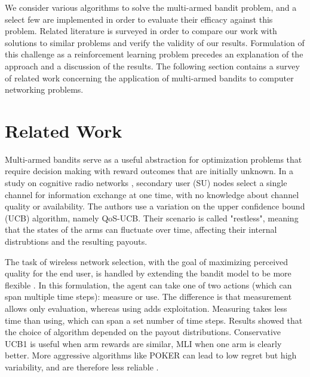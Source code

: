 \documentclass{article}
\begin{document}
We consider various algorithms to solve the multi-armed bandit problem, and a select few are implemented in order to evaluate their efficacy against this problem. 
Related literature is surveyed in order to compare our work with solutions to similar problems and verify the validity of our results. Formulation of this challenge 
as a reinforcement learning problem precedes an explanation of the approach and a discussion of the results. The following section contains a survey of related work 
concerning the application of multi-armed bandits to computer networking problems.

\section{Related Work}

Multi-armed bandits serve as a useful abstraction for optimization problems that require decision making with reward outcomes that are initially unknown. In a study 
on cognitive radio networks \cite{qos_selection_mab}, secondary user (SU) nodes select a single channel for information exchange at one time, with no knowledge about 
channel quality or availability. The authors use a variation on the upper confidence bound (UCB) algorithm, namely QoS-UCB. Their scenario is called "restless", 
meaning that the states of the arms can fluctuate over time, affecting their internal distrubtions and the resulting payouts.

The task of wireless network selection, with the goal of maximizing perceived quality for the end user, is handled by extending the bandit model to be more flexible 
\cite{muMAB_wireless}. In this formulation, the agent can take one of two actions (which can span multiple time steps): measure or use. The difference is that 
measurement allows only evaluation, whereas using adds exploitation. Measuring takes less time than using, which can span a set number of time steps. Results showed 
that the choice of algorithm depended on the payout distributions. Conservative UCB1 is useful when arm rewards are similar, MLI when one arm is clearly better. 
More aggressive algorithms like POKER can lead to low regret but high variability, and are therefore less reliable \cite{muMAB_wireless}.
\end{document}
